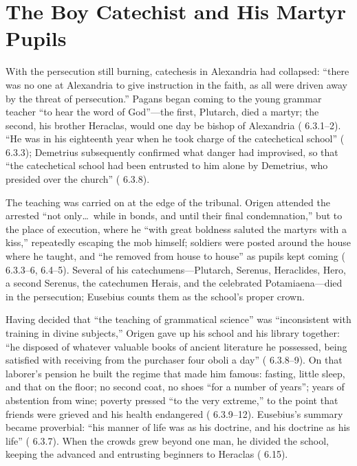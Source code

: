 \section{The Boy Catechist and His Martyr Pupils}

With the persecution still burning, catechesis in Alexandria had collapsed:
``there was no one at Alexandria to give instruction in the faith, as all
were driven away by the threat of persecution.'' Pagans began coming to the
young grammar teacher ``to hear the word of God''---the first, Plutarch, died
a martyr; the second, his brother Heraclas, would one day be bishop of
Alexandria ( 6.3.1--2). ``He was in his eighteenth year
when he took charge of the catechetical school'' (
6.3.3); Demetrius subsequently confirmed what danger had improvised, so that
``the catechetical school had been entrusted to him alone by Demetrius, who
presided over the church'' ( 6.3.8).

The teaching was carried on at the edge of the tribunal. Origen attended the
arrested ``not only\ldots\ while in bonds, and until their final
condemnation,'' but to the place of execution, where he ``with great boldness
saluted the martyrs with a kiss,'' repeatedly escaping the mob himself;
soldiers were posted around the house where he taught, and ``he removed from
house to house'' as pupils kept coming ( 6.3.3--6,
6.4--5). Several of his catechumens---Plutarch, Serenus, Heraclides, Hero,
a second Serenus, the catechumen Herais, and the celebrated Potamiaena---died
in the persecution; Eusebius counts them as the school's proper crown.

Having decided that ``the teaching of grammatical science'' was
``inconsistent with training in divine subjects,'' Origen gave up his
school and his library together: ``he disposed of whatever valuable books of
ancient literature he possessed, being satisfied with receiving from the
purchaser four oboli a day'' ( 6.3.8--9). On that
laborer's pension he built the regime that made him famous: fasting, little
sleep, and that on the floor; no second coat, no shoes ``for a number of
years''; years of abstention from wine; poverty pressed ``to the very
extreme,'' to the point that friends were grieved and his health endangered
( 6.3.9--12). Eusebius's summary became proverbial:
``his manner of life was as his doctrine, and his doctrine as his life''
( 6.3.7). When the crowds grew beyond one man, he
divided the school, keeping the advanced and entrusting beginners to Heraclas
( 6.15).

